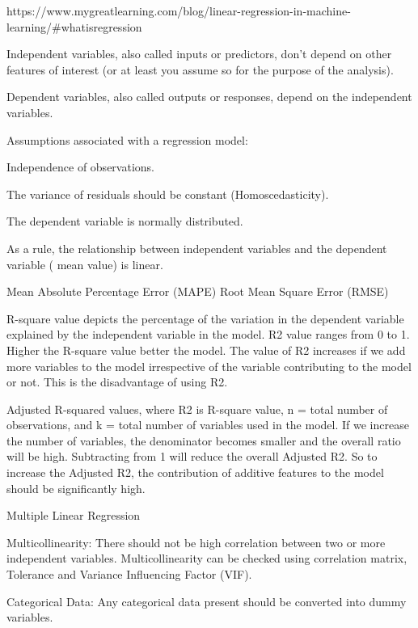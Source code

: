 https://www.mygreatlearning.com/blog/linear-regression-in-machine-learning/#whatisregression



Independent variables, also called inputs or predictors, don’t depend on other features of interest (or at least you assume so for the purpose of the analysis).

Dependent variables, also called outputs or responses, depend on the independent variables.

Assumptions associated with a regression model:

Independence of observations.

The variance of residuals should be constant (Homoscedasticity).

The dependent variable is normally distributed.

As a rule, the relationship between independent variables and the dependent variable ( mean value) is linear.


Mean Absolute Percentage Error (MAPE)
Root Mean Square Error (RMSE)

R-square value depicts the percentage of the variation in the dependent variable explained by the independent variable in the model. R2 value ranges from 0 to 1. Higher the R-square value better the model. The value of R2 increases if we add more variables to the model irrespective of the variable contributing to the model or not. This is the disadvantage of using R2.


Adjusted R-squared values, where R2 is R-square value, n = total number of observations, and k = total number of variables used in the model. If we increase the number of variables, the denominator becomes smaller and the overall ratio will be high. Subtracting from 1 will reduce the overall Adjusted R2. So to increase the Adjusted R2, the contribution of additive features to the model should be significantly high.


Multiple Linear Regression

Multicollinearity: There should not be high correlation between two or more independent variables. Multicollinearity can be checked using correlation matrix, Tolerance and Variance Influencing Factor (VIF).

Categorical Data: Any categorical data present should be converted into dummy variables.

